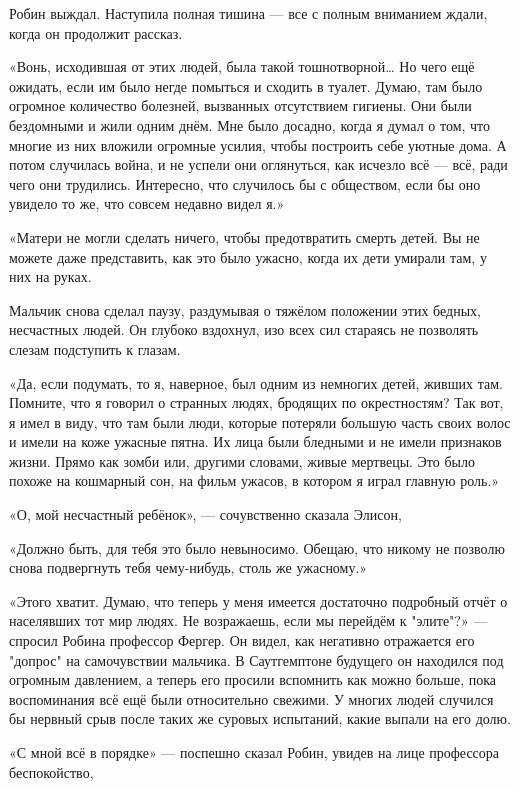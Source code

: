 \documentclass[a4paper,12pt]{book}
\begin{document}
\par
Робин выждал. Наступила полная тишина — все с полным вниманием ждали, когда он продолжит рассказ.
\par
«Вонь, исходившая от этих людей, была такой тошнотворной… Но чего ещё ожидать, если им было негде помыться и сходить в туалет. Думаю, там было огромное количество болезней, вызванных отсутствием гигиены. Они были бездомными и жили одним днём. Мне было досадно, когда я думал о том, что многие из них вложили огромные усилия, чтобы построить себе уютные дома. А потом случилась война, и не успели они оглянуться, как исчезло всё — всё, ради чего они трудились. Интересно, что случилось бы с обществом, если бы оно увидело то же, что совсем недавно видел я.»
\par
«Матери не могли сделать ничего, чтобы предотвратить смерть детей. Вы не можете даже представить, как это было ужасно, когда их дети умирали там, у них на руках.
\par
Мальчик снова сделал паузу, раздумывая о тяжёлом положении этих бедных, несчастных людей. Он глубоко вздохнул, изо всех сил стараясь не позволять слезам подступить к глазам.
\par
«Да, если подумать, то я, наверное, был одним из немногих детей, живших там. Помните, что я говорил о странных людях, бродящих по окрестностям? Так вот, я имел в виду, что там были люди, которые потеряли большую часть своих волос и имели на коже ужасные пятна. Их лица были бледными и не имели признаков жизни. Прямо как зомби или, другими словами, живые мертвецы. Это было похоже на кошмарный сон, на фильм ужасов, в котором я играл главную роль.»
\par
«О, мой несчастный ребёнок», — сочувственно сказала Элисон,
\par
«Должно быть, для тебя это было невыносимо. Обещаю, что никому не позволю снова подвергнуть тебя чему-нибудь, столь же ужасному.»
\par
«Этого хватит. Думаю, что теперь у меня имеется достаточно подробный отчёт о населявших тот мир людях. Не возражаешь, если мы перейдём к "элите"?» — спросил Робина профессор Фергер. Он видел, как негативно отражается его "допрос" на самочувствии мальчика. В Саутгемптоне будущего он находился под огромным давлением, а теперь его просили вспомнить как можно больше, пока воспоминания всё ещё были относительно свежими. У многих людей случился бы нервный срыв после таких же суровых испытаний, какие выпали на его долю.
\par
«С мной всё в порядке» — поспешно сказал Робин, увидев на лице профессора беспокойство,
\end{document}

